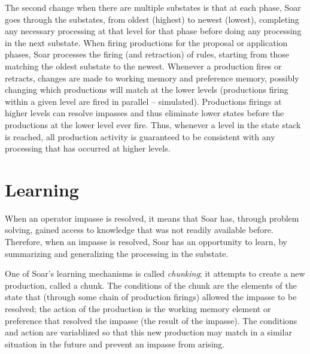 The second change when there are multiple substates is that at each
phase, Soar goes through the substates, from oldest (highest) to newest
(lowest), completing any necessary processing at that level for that
phase before doing any processing in the next substate.  When firing
productions for the proposal or application phases, Soar processes the
firing (and retraction) of rules, starting from those matching the
oldest substate to the newest.  Whenever a production fires or retracts,
changes are made to working memory and preference memory, possibly
changing which productions will match at the lower levels (productions
firing within a given level are fired in parallel -- simulated).
Productions firings at higher levels can resolve impasses and thus
eliminate lower states before the productions at the lower level ever
fire.  Thus, whenever a level in the state stack is reached, all
production activity is guaranteed to be consistent with any processing
that has occurred at higher levels.


\section{Learning}
\label{ARCH-learning} 

When an operator impasse is resolved, it means that Soar has, through problem 
solving,
gained access to knowledge that was not readily available before. Therefore,
when an impasse is resolved, Soar has an opportunity to learn, by summarizing
and generalizing the processing in the substate.

One of Soar's learning mechanisms is called \textit{chunking}; it attempts to create a
new production, called a chunk. The conditions of the chunk are the elements
of the state that (through some chain of production firings) allowed the
impasse to be resolved; the action of the production is the working
memory element or preference that
resolved the impasse (the result of the impasse). The conditions and action
are variablized so that this new production may match in a similar situation
in the future and prevent an impasse from arising. 

